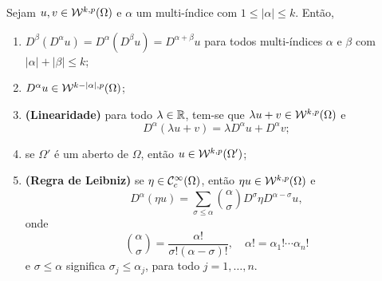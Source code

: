 \begin{tbox} \label{thm:propriedades-derivada-fraca}
    Sejam $u, v \in \mathcal{W}^{k,p}(\Omega)$ e $\alpha$ um multi-índice com $1 \leqslant |\alpha| \leqslant k$.
    Então,
    \begin{enumerate}[leftmargin=*, label=\textbf{(\alph*)}]
        \item $D^\beta(D^\alpha u) = D^\alpha (D^\beta u) = D^{\alpha + \beta} u$ para todos multi-índices $\alpha$ e $\beta$ com $|\alpha| + |\beta| \leqslant k$;
        \item $D^\alpha u \in \mathcal{W}^{k - |\alpha|,p}(\Omega)$;
        \item \textbf{(Linearidade)} para todo $\lambda \in \mathbb{R}$, tem-se que $\lambda u + v \in \mathcal{W}^{k,p}(\Omega)$ e
        \[
            D^{\alpha}(\lambda u + v) = \lambda D^\alpha u + D^\alpha v;
        \]
        \item se $\Omega'$ é um aberto de $\Omega$, então $u \in \mathcal{W}^{k,p}(\Omega')$;
        \item \textbf{(Regra de Leibniz)} se $\eta \in \mathcal{C}^\infty_c(\Omega)$, então $\eta u \in \mathcal{W}^{k,p}(\Omega)$ e
        \begin{equation} \label{eq:regra-de-leibniz}
            D^\alpha (\eta u) = \sum_{\sigma \leqslant \alpha} \binom{\alpha}{\sigma} D^{\sigma} \eta D^{\alpha - \sigma} u,
        \end{equation}
        onde
        \[
            \binom{\alpha}{\sigma} = \frac{\alpha!}{\sigma!(\alpha - \sigma)!}, \quad \alpha! = \alpha_1!\cdots \alpha_n!
        \]
        e $\sigma \leqslant \alpha$ significa $\sigma_j \leqslant \alpha_j$, para todo $j = 1,\dots,n$.
    \end{enumerate}
\end{tbox}
